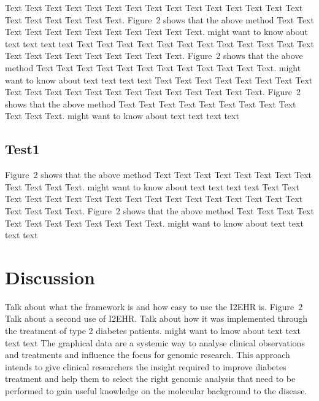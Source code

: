 \documentclass{bioinfo}
\begin{document}
Text Text Text Text Text Text  Text Text Text Text Text Text Text
Text Text  Text Text Text Text Text Text.
Figure~2\vphantom{\ref{fig:02}} shows that the above method  Text
Text Text Text  Text Text Text Text Text Text  Text Text.
\citealp{Boffelli03} might want to know about  text text text text
Text Text Text Text Text Text  Text Text Text Text Text Text Text
Text Text  Text Text Text Text Text Text.
Figure~2\vphantom{\ref{fig:02}} shows that the above method  Text
Text Text Text  Text Text Text Text Text Text  Text Text.
\citealp{Boffelli03} might want to know about  text text text text
Text Text Text Text Text Text Text Text Text Text Text Text Text
Text Text  Text Text Text Text Text Text.
Figure~2\vphantom{\ref{fig:02}} shows that the above method  Text
Text Text Text  Text Text Text Text Text Text  Text Text.
\citealp{Boffelli03} might want to know about  text text text text


\subsection{Test1}



Figure~2\vphantom{\ref{fig:02}} shows that the above method  Text
Text Text Text  Text Text Text Text Text Text  Text Text.
\citealp{Boffelli03} might want to know about  text text text text
Text Text Text Text Text Text Text Text Text Text Text Text Text
Text Text  Text Text Text Text Text Text.
Figure~2\vphantom{\ref{fig:02}} shows that the above method  Text
Text Text Text  Text Text Text Text Text Text  Text Text.
\citealp{Boffelli03} might want to know about  text text text text





\section{Discussion}

Talk about what the framework is and how easy to use the I2EHR is.
Figure~2\vphantom{\ref{fig:02}} Talk about a second use of I2EHR. Talk about how it was implemented through the treatment of type 2 diabetes patients. 
\citealp{Boffelli03} might want to know about  text text text text
The graphical data are a systemic way to analyse clinical observations and treatments and influence the focus for genomic research. 
This approach intends to give clinical researchers the insight required to improve diabetes treatment and help them to select the right genomic analysis that need to be performed to gain useful knowledge on the molecular background to the disease.
\end{document}
